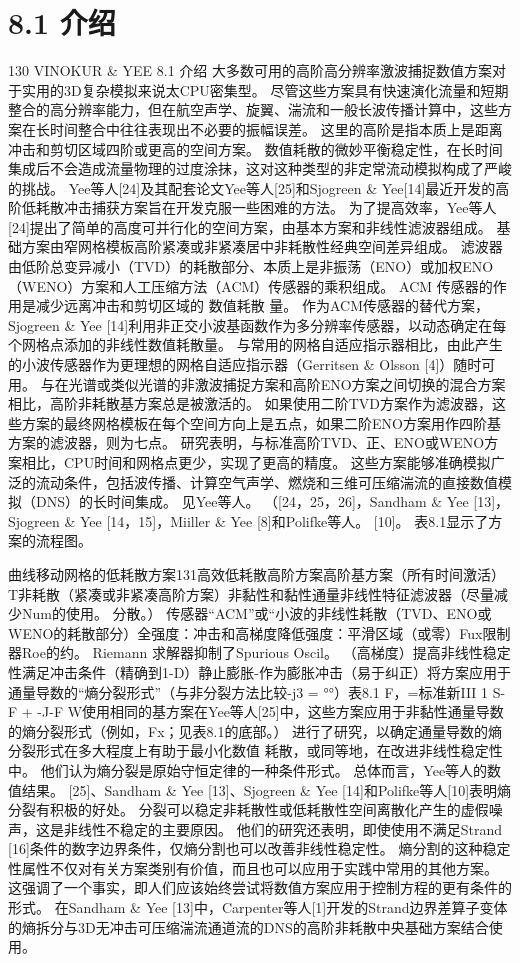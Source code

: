 \documentclass[UTF8,11pt,a4paper,openany,fontset=fandol]{ctexbook}
\begin{document}
\section{8.1 介绍}
130 VINOKUR \& YEE 8.1 介绍 大多数可用的高阶高分辨率激波捕捉数值方案对于实用的3D复杂模拟来说太CPU密集型。 尽管这些方案具有快速演化流量和短期整合的高分辨率能力，但在航空声学、旋翼、湍流和一般长波传播计算中，这些方案在长时间整合中往往表现出不必要的振幅误差。 这里的高阶是指本质上是距离冲击和剪切区域四阶或更高的空间方案。 数值耗散的微妙平衡稳定性，在长时间集成后不会造成流量物理的过度涂抹，这对这种类型的非定常流动模拟构成了严峻的挑战。 Yee等人[24]及其配套论文Yee等人[25]和Sjogreen \& Yee[14]最近开发的高阶低耗散冲击捕获方案旨在开发克服一些困难的方法。 为了提高效率，Yee等人[24]提出了简单的高度可并行化的空间方案，由基本方案和非线性滤波器组成。 基础方案由窄网格模板高阶紧凑或非紧凑居中非耗散性经典空间差异组成。 滤波器由低阶总变异减小（TVD）的耗散部分、本质上是非振荡（ENO）或加权ENO（WENO）方案和人工压缩方法（ACM）传感器的乘积组成。 ACM 传感器的作用是减少远离冲击和剪切区域的 数值耗散 量。 作为ACM传感器的替代方案，Sjogreen \& Yee [14]利用非正交小波基函数作为多分辨率传感器，以动态确定在每个网格点添加的非线性数值耗散量。 与常用的网格自适应指示器相比，由此产生的小波传感器作为更理想的网格自适应指示器（Gerritsen \& Olsson [4]）随时可用。 与在光谱或类似光谱的非激波捕捉方案和高阶ENO方案之间切换的混合方案相比，高阶非耗散基方案总是被激活的。 如果使用二阶TVD方案作为滤波器，这些方案的最终网格模板在每个空间方向上是五点，如果二阶ENO方案用作四阶基方案的滤波器，则为七点。 研究表明，与标准高阶TVD、正、ENO或WENO方案相比，CPU时间和网格点更少，实现了更高的精度。 这些方案能够准确模拟广泛的流动条件，包括波传播、计算空气声学、燃烧和三维可压缩湍流的直接数值模拟（DNS）的长时间集成。 见Yee等人。 （[24，25，26]，Sandham \& Yee [13]，Sjogreen \& Yee [14，15]，Miiller \& Yee [8]和Polifke等人。 [10]。 表8.1显示了方案的流程图。

曲线移动网格的低耗散方案131高效低耗散高阶方案高阶基方案（所有时间激活）T非耗散（紧凑或非紧凑高阶方案）非黏性和黏性通量非线性特征滤波器（尽量减少Num的使用。 分散。） 传感器“ACM”或“小波的非线性耗散（TVD、ENO或WENO的耗散部分）全强度：冲击和高梯度降低强度：平滑区域（或零）Fux限制器Roe的约。 Riemann 求解器抑制了Spurious Oscil。 （高梯度）提高非线性稳定性满足冲击条件（精确到1-D）静止膨胀-作为膨胀冲击（易于纠正）将方案应用于通量导数的“熵分裂形式”（与非分裂方法比较-j3 = °°）表8.1 F，=标准新III 1 S-F + -J-F W使用相同的基方案在Yee等人[25]中，这些方案应用于非黏性通量导数的熵分裂形式（例如，Fx；见表8.1的底部。） 进行了研究，以确定通量导数的熵分裂形式在多大程度上有助于最小化数值 耗散，或同等地，在改进非线性稳定性中。 他们认为熵分裂是原始守恒定律的一种条件形式。 总体而言，Yee等人的数值结果。 [25]、Sandham \& Yee [13]、Sjogreen \& Yee [14]和Polifke等人[10]表明熵分裂有积极的好处。 分裂可以稳定非耗散性或低耗散性空间离散化产生的虚假噪声，这是非线性不稳定的主要原因。 他们的研究还表明，即使使用不满足Strand [16]条件的数字边界条件，仅熵分割也可以改善非线性稳定性。 熵分割的这种稳定性属性不仅对有关方案类别有价值，而且也可以应用于实践中常用的其他方案。 这强调了一个事实，即人们应该始终尝试将数值方案应用于控制方程的更有条件的形式。 在Sandham \& Yee [13]中，Carpenter等人[1]开发的Strand边界差算子变体的熵拆分与3D无冲击可压缩湍流通道流的DNS的高阶非耗散中央基础方案结合使用。
\end{document}
